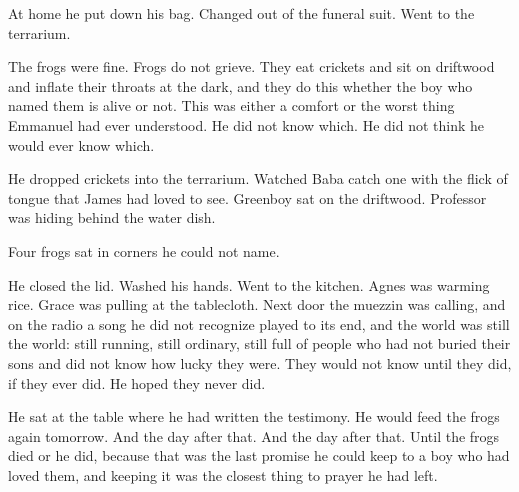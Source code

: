 At home he put down his bag. Changed out of the funeral suit. Went to the terrarium.

The frogs were fine. Frogs do not grieve. They eat crickets and sit on driftwood and inflate their throats at the dark, and they do this whether the boy who named them is alive or not. This was either a comfort or the worst thing Emmanuel had ever understood. He did not know which. He did not think he would ever know which.

He dropped crickets into the terrarium. Watched Baba catch one with the flick of tongue that James had loved to see. Greenboy sat on the driftwood. Professor was hiding behind the water dish.

Four frogs sat in corners he could not name.

He closed the lid. Washed his hands. Went to the kitchen. Agnes was warming rice. Grace was pulling at the tablecloth. Next door the muezzin was calling, and on the radio a song he did not recognize played to its end, and the world was still the world: still running, still ordinary, still full of people who had not buried their sons and did not know how lucky they were. They would not know until they did, if they ever did. He hoped they never did.

He sat at the table where he had written the testimony. He would feed the frogs again tomorrow. And the day after that. And the day after that. Until the frogs died or he did, because that was the last promise he could keep to a boy who had loved them, and keeping it was the closest thing to prayer he had left.

